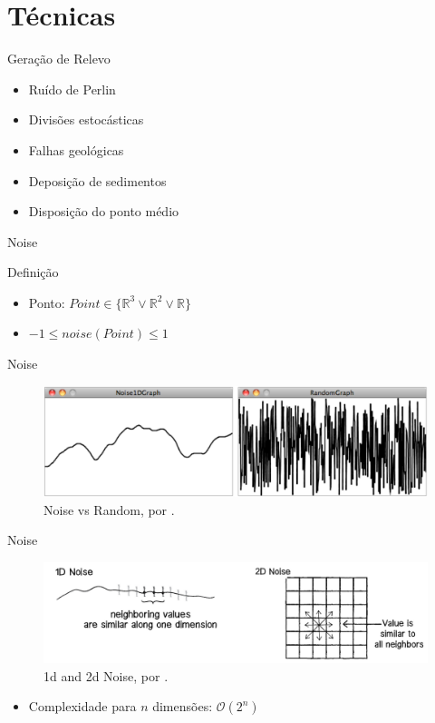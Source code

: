 \section{Técnicas}

\begin{frame}{Geração de Relevo}
    \begin{itemize}[<+- | alert@+>]
        \item \alert<6>{Ruído de Perlin}
        \item Divisões estocásticas
        \item Falhas geológicas
        \item Deposição de sedimentos
        \item Disposição do ponto médio
    \end{itemize}
\end{frame}

\begin{frame}{Noise}
    \begin{block}{Definição}
        \begin{itemize}
            \item Ponto: $Point \in \{ \mathbb{R}^3 \vee \mathbb{R}^2 \vee \mathbb{R}\} $
            \item $ -1 \leq noise(Point) \leq 1$
        \end{itemize}
    \end{block}
\end{frame}

\begin{frame}{Noise}
    \begin{figure}
		\centering
        \includegraphics[width=.7\textwidth]{img/explain/noiseRandom.png}
        \caption{\alert{Noise vs Random}, por \cite{shiffman2012nature}.}
    \end{figure}
\end{frame}

\begin{frame}{Noise}
    \begin{figure}
		\centering
        \includegraphics[width=.7\textwidth]{img/explain/1d2dnoise.png}
        \caption{\alert{1d and 2d Noise}, por \cite{shiffman2012nature}.}
    \end{figure}
    \begin{itemize}
        \item Complexidade para $n$ dimensões: $\mathcal{O}(2^n)$
    \end{itemize}
\end{frame}


